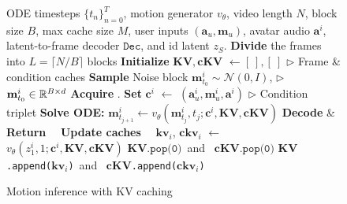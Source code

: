 \begin{figure}[t]
\vspace{-0.15in}
\centering
\begin{minipage}{1.0\linewidth}
\begin{algorithm}[H]
\small 
\caption{\label{algo:sampling} Motion inference with KV caching} 
\begin{algorithmic}[1]
\Require ODE timesteps $\{t_n\}^T_{n=0}$, motion generator $v_{\theta}$, video length $N$, block size $B$, max cache size $M$, user inputs $(\mathbf{a}_{u},\mathbf{m}_{u})$, avatar audio $\mathbf{a}^i$, latent-to-frame decoder $\texttt{Dec}$, and id latent $z_S$. 
\State \textbf{Divide} the frames into $L = \lceil N / B \rceil$ blocks
\State \textbf{Initialize} $\mathbf{KV}, \mathbf{cKV}$ $\leftarrow [~], [~]$ $\rhd$ Frame \& condition caches
    \State \textbf{Sample} Noise block $\mathbf{m}_{t_{0}}^{i} \sim \mathcal{N}(0, I)$, \hfill $\rhd$ $\mathbf{m}_{t_{0}}^{i}\in\mathbb{R}^{B \times d}$
    \State \textbf{Acquire} .
    \State \textbf{Set} $\mathbf{c}^i$ $\leftarrow$ $(\mathbf{a}^i_{u}, \mathbf{m}_{u}^i, \mathbf{a}^i)$ \hfill $\rhd$ Condition triplet
        \State \textbf{Solve ODE:} $\mathbf{m}_{t_{j+1}}^{i} \leftarrow v_{\theta}(\mathbf{m}_{t_j}^{i}, t_j; \mathbf{c}^i, \mathbf{KV}, \mathbf{cKV})$
    \EndFor
    \State \textbf{Decode} \& \textbf{Return}~~ 
    \State \textbf{Update caches}~~ $\mathbf{kv}_i$, $\mathbf{ckv}_i$ $\leftarrow$ $v_{\theta}(z_{1}^{i}, 1; \mathbf{c}^i, \mathbf{KV}, \mathbf{cKV})$    
    \State $\mathbf{KV}{\texttt{.pop(0)}}$~and~  $\mathbf{cKV}{\texttt{.pop(0)}}$
    \EndIf
    \State $\mathbf{KV}${\texttt{.append($\mathbf{kv}_i$)}}~and~ $\mathbf{cKV}${\texttt{.append($\mathbf{ckv}_i$)}}
\EndFor
\end{algorithmic}
\end{algorithm}
\end{minipage}
\vspace{-0.3in}
\end{figure}